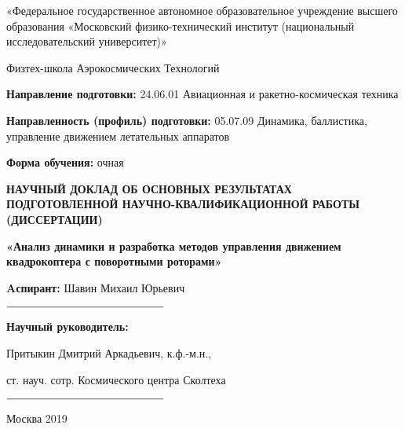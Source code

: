 \thispagestyle{empty}
\begin{center} 
«Федеральное государственное автономное образовательное учреждение высшего образования «Московский физико-технический институт (национальный исследовательский университет)»
\end{center}
\begin{center} 
Физтех-школа Аэрокосмических Технологий
\end{center}

{
   	\vskip 5mm
}

\begin{flushleft}
\textbf{Направление подготовки:} 24.06.01 Авиационная и ракетно-космическая техника

\textbf{Направленность (профиль) подготовки:} 05.07.09 Динамика, баллистика, управление движением летательных аппаратов

\textbf{Форма обучения:} очная
\end{flushleft}

{
	\vskip 1cm
}

\begin{center} 
\textbf{НАУЧНЫЙ ДОКЛАД ОБ ОСНОВНЫХ РЕЗУЛЬТАТАХ ПОДГОТОВЛЕННОЙ НАУЧНО-КВАЛИФИКАЦИОННОЙ РАБОТЫ (ДИССЕРТАЦИИ)}
\end{center}

\begin{center} 
\textbf{«Анализ динамики и разработка методов управления движением квадрокоптера с поворотными роторами»}
\end{center}

{
	\vskip 1cm
}


\begin{flushright}
\textbf{Aспирант:} Шавин Михаил Юрьевич \hspace{16mm} \vspace{5mm}

$\rule{5cm}{0.15mm}$

\textbf{Научный руководитель:}  \hspace{41mm}

Притыкин Дмитрий Аркадьевич, к.ф.-м.н., \hspace{6mm} 

ст. науч. сотр. Космического центра Сколтеха \vspace{5mm}

$\rule{5cm}{0.15mm}$

\end{flushright}

{
	\vskip 5mm
}

\begin{center} 
Москва 2019
\end{center}
